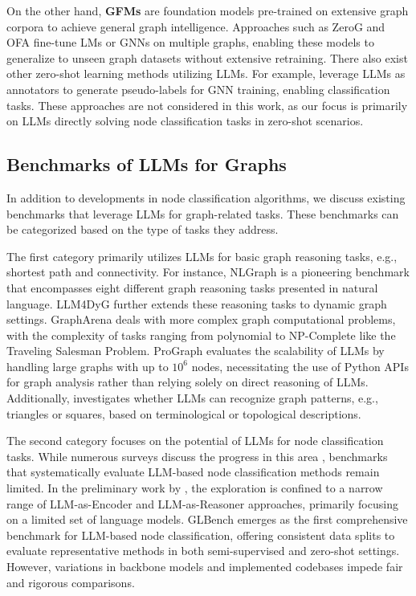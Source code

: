 On the other hand, \textbf{GFMs} are foundation models pre-trained on extensive graph corpora to achieve general graph intelligence. Approaches such as ZeroG \cite{li2024zerog} and OFA \cite{liu2023one} fine-tune LMs or GNNs on multiple graphs, enabling these models to generalize to unseen graph datasets without extensive retraining. There also exist other zero-shot learning methods utilizing LLMs. For example, \citet{chen2024label} leverage LLMs as annotators to generate pseudo-labels for GNN training, enabling classification tasks. These approaches are not considered in this work, as our focus is primarily on LLMs directly solving node classification tasks in zero-shot scenarios.


\subsection{Benchmarks of LLMs for Graphs}
In addition to developments in node classification algorithms, we discuss existing benchmarks that leverage LLMs for graph-related tasks. These benchmarks can be categorized based on the type of tasks they address.

The first category primarily utilizes LLMs for basic graph reasoning tasks, e.g., shortest path and connectivity. For instance, NLGraph \cite{wang2023can} is a pioneering benchmark that encompasses eight different graph reasoning tasks presented in natural language. LLM4DyG \cite{zhang2023LLM4DyG} further extends these reasoning tasks to dynamic graph settings. GraphArena \cite{tang2024GraphArena} deals with more complex graph computational problems, with the complexity of tasks ranging from polynomial to NP-Complete like the Traveling Salesman Problem.  ProGraph \cite{li2024prograph} evaluates the scalability of LLMs by handling large graphs with up to $10^6$ nodes, necessitating the use of Python APIs for graph analysis rather than relying solely on direct reasoning of LLMs. Additionally, \citet{dai2024llm4pattern} investigates whether LLMs can recognize graph patterns, e.g., triangles or squares, based on terminological or topological descriptions.

The second category focuses on the potential of LLMs for node classification tasks. While numerous surveys discuss the progress in this area \cite{li2023survey, jin@llmgraph}, benchmarks that systematically evaluate LLM-based node classification methods remain limited. In the preliminary work by \citet{chen2024exploring}, the exploration is confined to a narrow range of LLM-as-Encoder and LLM-as-Reasoner approaches, primarily focusing on a limited set of language models. GLBench \cite{Li2024GLBench} emerges as the first comprehensive benchmark for LLM-based node classification, offering consistent data splits to evaluate representative methods in both semi-supervised and zero-shot settings. However, variations in backbone models and implemented codebases impede fair and rigorous comparisons. 

